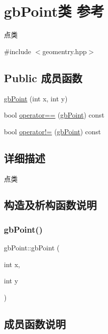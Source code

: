 \hypertarget{classgb_point}{}\section{gb\+Point类 参考}
\label{classgb_point}


点类  




{\ttfamily \#include $<$geomentry.\+hpp$>$}

\subsection*{Public 成员函数}
\begin{DoxyCompactItemize}
\item 
\mbox{\hyperlink{classgb_point_a996a435065205fc3122ee264d30e1b87}{gb\+Point}} (int x, int y)
\item 
bool \mbox{\hyperlink{classgb_point_ad7098c927e18d1d326fd9d68c0d4f7f9}{operator==}} (\mbox{\hyperlink{classgb_point}{gb\+Point}}) const
\item 
bool \mbox{\hyperlink{classgb_point_a0e466493a4b7c6d3537a6d514c06f7b9}{operator!=}} (\mbox{\hyperlink{classgb_point}{gb\+Point}}) const
\end{DoxyCompactItemize}


\subsection{详细描述}
点类 

\subsection{构造及析构函数说明}
\mbox{\label{classgb_point_a996a435065205fc3122ee264d30e1b87}} 
\subsubsection{\texorpdfstring{gbPoint()}{gbPoint()}}
{\footnotesize\ttfamily gb\+Point\+::gb\+Point (\begin{DoxyParamCaption}\item[{int}]{x,  }\item[{int}]{y }\end{DoxyParamCaption})}



\subsection{成员函数说明}
\mbox{\label{classgb_point_a0e466493a4b7c6d3537a6d514c06f7b9}} 
